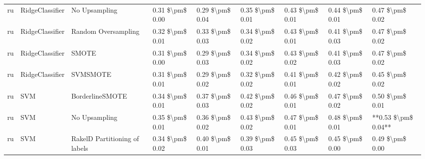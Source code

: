 \begin{tabular}{lllllllll}
      ru &                 RidgeClassifier &                 No Upsampling & 0.31 \$\textbackslash pm\$ 0.00 &           0.29 \$\textbackslash pm\$ 0.04 &       0.35 \$\textbackslash pm\$ 0.01 &        0.43 \$\textbackslash pm\$ 0.01 &                         0.44 \$\textbackslash pm\$ 0.01 &     0.47 \$\textbackslash pm\$ 0.02 \\
      ru &                 RidgeClassifier &           Random Oversampling & 0.32 \$\textbackslash pm\$ 0.01 &           0.33 \$\textbackslash pm\$ 0.03 &       0.34 \$\textbackslash pm\$ 0.02 &        0.43 \$\textbackslash pm\$ 0.01 &                         0.41 \$\textbackslash pm\$ 0.03 &     0.47 \$\textbackslash pm\$ 0.02 \\
      ru &                 RidgeClassifier &                         SMOTE & 0.31 \$\textbackslash pm\$ 0.00 &           0.29 \$\textbackslash pm\$ 0.03 &       0.34 \$\textbackslash pm\$ 0.02 &        0.43 \$\textbackslash pm\$ 0.02 &                         0.41 \$\textbackslash pm\$ 0.03 &     0.47 \$\textbackslash pm\$ 0.02 \\
      ru &                 RidgeClassifier &                      SVMSMOTE & 0.31 \$\textbackslash pm\$ 0.01 &           0.29 \$\textbackslash pm\$ 0.02 &       0.32 \$\textbackslash pm\$ 0.02 &        0.41 \$\textbackslash pm\$ 0.01 &                         0.42 \$\textbackslash pm\$ 0.02 &     0.45 \$\textbackslash pm\$ 0.02 \\
      ru &                             SVM &               BorderlineSMOTE & 0.34 \$\textbackslash pm\$ 0.01 &           0.37 \$\textbackslash pm\$ 0.03 &       0.42 \$\textbackslash pm\$ 0.02 &        0.46 \$\textbackslash pm\$ 0.01 &                         0.47 \$\textbackslash pm\$ 0.02 &     0.50 \$\textbackslash pm\$ 0.01 \\
      ru &                             SVM &                 No Upsampling & 0.35 \$\textbackslash pm\$ 0.01 &           0.36 \$\textbackslash pm\$ 0.02 &       0.43 \$\textbackslash pm\$ 0.02 &        0.47 \$\textbackslash pm\$ 0.01 &                         0.48 \$\textbackslash pm\$ 0.01 & **0.53 \$\textbackslash pm\$ 0.04** \\
      ru &                             SVM & RakelD Partitioning of labels & 0.34 \$\textbackslash pm\$ 0.02 &           0.40 \$\textbackslash pm\$ 0.01 &       0.39 \$\textbackslash pm\$ 0.03 &        0.45 \$\textbackslash pm\$ 0.03 &                         0.45 \$\textbackslash pm\$ 0.00 &     0.49 \$\textbackslash pm\$ 0.00 \\

\end{tabular}
